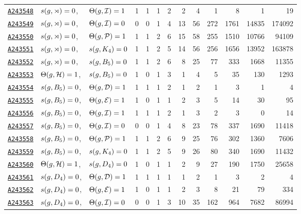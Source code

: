 \documentclass[12pt]{article}
\newcommand{\OEIS}[1]
{\href{https://oeis.org/#1}{\texttt{#1}}}
\begin{document}
\begin{appendices}
\begin{longtable}{ l l l r r r r r r r r r r}
\OEIS{A243548} & $s{}(g,\rtimes) =0$, & $\Theta(g,\mathcal{I}) =1$ & 1 & 1 & 1 & 2 & 2 & 4 & 1 & 8 & 1 & 19 \\
\OEIS{A243549} & $s{}(g,\rtimes) =0$, & $\Theta(g,\mathcal{I}) =0$ & 0 & 0 & 1 & 4 & 13 & 56 & 272 & 1761 & 14835 & 174092 \\
\OEIS{A243550} & $s{}(g,\rtimes) =0$, & $\Theta(g,\mathcal{P}) =1$ & 1 & 1 & 2 & 6 & 15 & 58 & 255 & 1510 & 10766 & 94109 \\
\OEIS{A243551} & $s{}(g,\rtimes) =0$, & $s{}(g,K_4) =0$ & 1 & 1 & 2 & 5 & 14 & 56 & 256 & 1656 & 13952 & 163878 \\
\OEIS{A243552} & $s{}(g,\rtimes) =0$, & $s{}(g,B_5) =0$ & 1 & 1 & 2 & 6 & 8 & 25 & 77 & 333 & 1668 & 11355 \\
\OEIS{A243553} & $\Theta(g,\mathcal{H}) =1$, & $s{}(g,B_5) =0$ & 1 & 0 & 1 & 3 & 1 & 4 & 5 & 35 & 130 & 1293 \\
\OEIS{A243554} & $s{}(g,B_5) =0$, & $\Theta(g,\mathcal{D}) =1$ & 1 & 1 & 1 & 2 & 1 & 2 & 1 & 3 & 1 & 4 \\
\OEIS{A243555} & $s{}(g,B_5) =0$, & $\Theta(g,\mathcal{E}) =1$ & 1 & 0 & 1 & 1 & 2 & 3 & 5 & 14 & 30 & 95 \\
\OEIS{A243556} & $s{}(g,B_5) =0$, & $\Theta(g,\mathcal{I}) =1$ & 1 & 1 & 1 & 2 & 1 & 3 & 2 & 3 & 0 & 14 \\
\OEIS{A243557} & $s{}(g,B_5) =0$, & $\Theta(g,\mathcal{I}) =0$ & 0 & 0 & 1 & 4 & 8 & 23 & 78 & 337 & 1690 & 11418 \\
\OEIS{A243558} & $s{}(g,B_5) =0$, & $\Theta(g,\mathcal{P}) =1$ & 1 & 1 & 2 & 6 & 9 & 25 & 76 & 302 & 1360 & 7606 \\
\OEIS{A243559} & $s{}(g,B_5) =0$, & $s{}(g,K_4) =0$ & 1 & 1 & 2 & 5 & 9 & 26 & 80 & 340 & 1690 & 11432 \\
\OEIS{A243560} & $\Theta(g,\mathcal{H}) =1$, & $s{}(g,D_4) =0$ & 1 & 0 & 1 & 1 & 2 & 9 & 27 & 190 & 1750 & 25658 \\
\OEIS{A243561} & $s{}(g,D_4) =0$, & $\Theta(g,\mathcal{D}) =1$ & 1 & 1 & 1 & 1 & 1 & 2 & 1 & 3 & 2 & 4 \\
\OEIS{A243562} & $s{}(g,D_4) =0$, & $\Theta(g,\mathcal{E}) =1$ & 1 & 0 & 1 & 1 & 2 & 3 & 8 & 21 & 79 & 334 \\
\OEIS{A243563} & $s{}(g,D_4) =0$, & $\Theta(g,\mathcal{I}) =0$ & 0 & 0 & 1 & 3 & 10 & 35 & 162 & 964 & 7682 & 86994 \\

\end{longtable}
\end{appendices}
\end{document}
